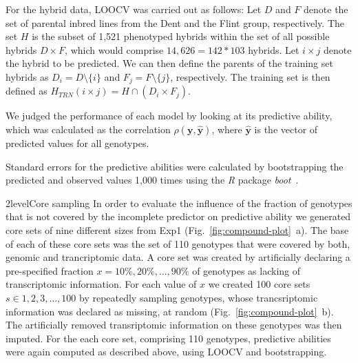 \documentclass[12pt,titlepage]{article}
\begin{document}
For the hybrid data, LOOCV was carried out as follows:
Let $D$ and $F$ denote the set of parental inbred lines from the Dent and the 
Flint group, respectively.
The set $H$ is the subset of 1,521 phenotyped hybrids within the set of all
possible hybrids $D \times F$, which would comprise $14,626 = 142 * 103$
hybrids.
Let $i \times j$ denote the hybrid to be predicted.
We can then define the parents of the training set hybrids as
$D_{i} = D \setminus \{i\}$ and $F_{j} = F \setminus \{j\}$, respectively.
The training set is then defined as 
$H_{TRN}(i \times j) = H \cap (D_{i} \times F_{j})$.

We judged the performance of each model by looking at its predictive ability,
which was calculated as the correlation $\rho(\mathbf{y}, \mathbf{\hat{y}})$,
where $\mathbf{\hat{y}}$ is the vector of predicted values for all genotypes.

Standard errors for the predictive abilities were calculated by bootstrapping
the predicted and observed values 1,000 times using the \emph{R} package 
\emph{boot}~\cite{Canty2017}.



\Genetics2level{Core sampling}
In order to evaluate the influence of the fraction of genotypes that is not
covered by the incomplete predictor on predictive ability we generated core
sets of nine different sizes from Exp1 (Fig.~\ref{fig:compound-plot}~a).
The base of each of these core sets was the set of 110 genotypes that were
covered by both, genomic and trancriptomic data.
A core set was created by artificially declaring a pre-specified fraction 
$x = {10\%, 20\%, \dots, 90\%}$ of genotypes as lacking of transcriptomic 
information.
For each value of $x$ we created 100 core sets $s \in {1, 2, 3, \dots, 100}$ by
repeatedly sampling genotypes, whose trancsriptomic information was declared
as missing, at random (Fig.~\ref{fig:compound-plot}~b).
The artificially removed transriptomic information on these genotypes was then
imputed.
For the each core set, comprising 110 genotypes, predictive abilities were again
computed as described above, using LOOCV and bootstrapping.
\end{document}
